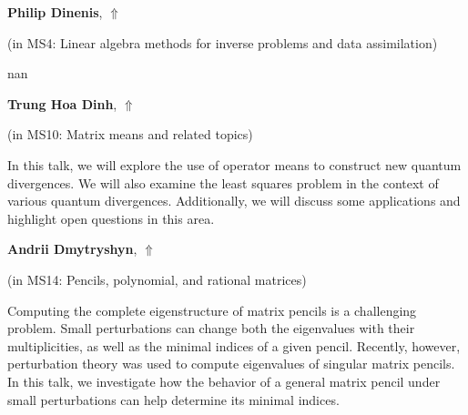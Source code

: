 \documentclass[ILAS2025-program.tex]{subfiles}
\begin{document}
     \hypertarget{down0357}{}\begin{ilasabstract}
    
    \textbf{Philip Dinenis},  \hfill \hyperlink{up0357}{$\Uparrow$}
    
    (in {\color{mstitle}MS4: Linear algebra methods for inverse problems and data assimilation})
        
        \mtskip
    nan\end{ilasabstract}
     \hypertarget{down0254}{}\begin{ilasabstract}
    
    \textbf{Trung Hoa Dinh},  \hfill \hyperlink{up0254}{$\Uparrow$}
    
    (in {\color{mstitle}MS10: Matrix means and related topics})
        
        \mtskip
    In this talk, we will explore the use of operator means to construct new quantum divergences. We will also examine the least squares problem in the context of various quantum divergences. Additionally, we will discuss some applications and highlight open questions in this area.
\end{ilasabstract}
     \hypertarget{down0216}{}\begin{ilasabstract}
    
    \textbf{Andrii Dmytryshyn},  \hfill \hyperlink{up0216}{$\Uparrow$}
    
    (in {\color{mstitle}MS14: Pencils, polynomial, and rational matrices})
        
        \mtskip
    Computing the complete eigenstructure of matrix pencils is a challenging problem. Small perturbations can change both the eigenvalues with their multiplicities, as well as the minimal indices of a given pencil. Recently, however, perturbation theory was used to compute eigenvalues of singular matrix pencils. In this talk, we investigate how the behavior of a general matrix pencil under small perturbations can help determine its minimal indices.
\end{ilasabstract}
\end{document}
